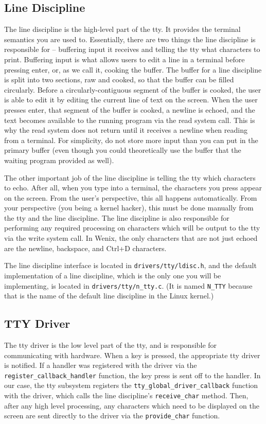 \subsection{Line Discipline}
The line discipline is the high-level part of the tty. It provides the terminal semantics you are used to. Essentially, there are two things the line discipline is responsible for -- buffering input it receives and telling the tty what characters to print. Buffering input is what allows users to edit a line in a terminal before pressing enter, or, as we call it, cooking the buffer. The buffer for a line discipline is split into two sections, raw and cooked, so that the buffer can be filled circularly. Before a circularly-contiguous segment of the buffer is cooked, the user is able to edit it by editing the current line of text on the screen. When the user presses enter, that segment of the buffer is cooked, a newline is echoed, and the text becomes available to the running program via the read system call. This is why the read system does not return until it receives a newline when reading from a terminal. For simplicity, do not store more input than you can put in the primary buffer (even though you could theoretically use the buffer that the waiting program provided as well).

The other important job of the line discipline is telling the tty which characters to echo. After all, when you type into a terminal, the characters you press appear on the screen. From the user's perspective, this all happens automatically. From your perspective (you being a kernel hacker), this must be done manually from the tty and the line discipline. The line discipline is also responsible for performing any required processing on characters which will be output to the tty via the write system call. In Wenix, the only characters that are not just echoed are the newline, backspace, and Ctrl+D characters.

The line discipline interface is located in \texttt{drivers/tty/ldisc.h}, and the default implementation of a line discipline, which is the only one you will be implementing, is located in \texttt{drivers/tty/n\_tty.c}. (It is named \texttt{N\_TTY} because that is the name of the default line discipline in the Linux kernel.) 

\subsection{TTY Driver}
The tty driver is the low level part of the tty, and is responsible for communicating with hardware. When a key is pressed, the appropriate tty driver is notified. If a handler was registered with the driver via the \texttt{register\_callback\_handler} function, the key press is sent off to the handler. In our case, the tty subsystem registers the \texttt{tty\_global\_driver\_callback} function with the driver, which calls the line discipline's \texttt{receive\_char} method. Then, after any high level processing, any characters which need to be displayed on the screen are sent directly to the driver via the \texttt{provide\_char} function.

